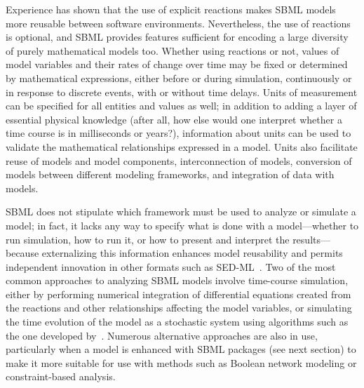 \documentclass[]{draft-sbml-paper}
\begin{document}

Experience has shown that the use of explicit reactions makes SBML models more reusable between software environments.  Nevertheless, the use of reactions is optional, and SBML provides features sufficient for encoding a large diversity of purely mathematical models too.  Whether using reactions or not, values of model variables and their rates of change over time may be fixed or determined by mathematical expressions, either before or during simulation, continuously or in response to discrete events, with or without time delays.  Units of measurement can be specified for all entities and values as well; in addition to adding a layer of essential physical knowledge (after all, how else would one interpret whether a time course is in milliseconds or years?), information about units can be used to validate the mathematical relationships expressed in a model.  Units also facilitate reuse of models and model components, interconnection of models, conversion of models between different modeling frameworks, and integration of data with models.

SBML does not stipulate which framework must be used to analyze or simulate a model; in fact, it lacks any way to specify what is done with a model---whether to run simulation, how to run it, or how to present and interpret the results---because externalizing this information enhances model reusability and permits independent innovation in other formats such as SED-ML~\citep{waltemath2011reproducible}. Two of the most common approaches to analyzing SBML models involve time-course simulation, either by performing numerical integration of differential equations created from the reactions and other relationships affecting the model variables, or simulating the time evolution of the model as a stochastic system using algorithms such as the one developed by~\cite{gillespie1977exact}.  Numerous alternative approaches are also in use, particularly when a model is enhanced with SBML packages (see next section) to make it more suitable for use with methods such as Boolean network modeling or constraint-based analysis.
\end{document}
